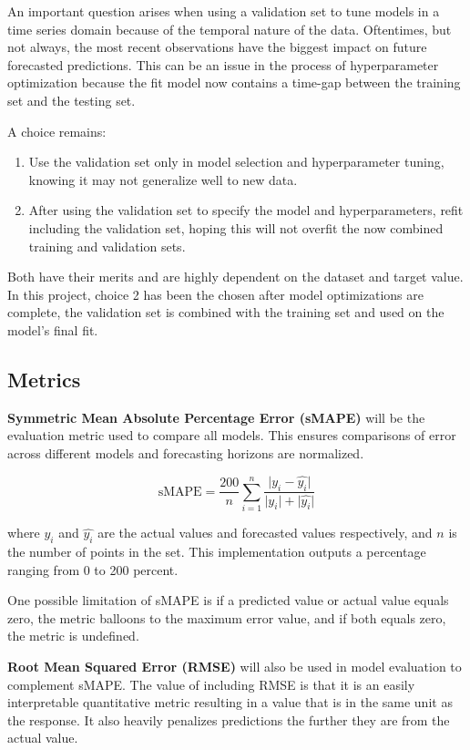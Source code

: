 \documentclass[sigconf]{acmart}
\begin{document}
An important question arises when using a validation set to tune models in a time series domain because of the temporal nature of the data. Oftentimes, but not always, the most recent observations have the biggest impact on future forecasted predictions. This can be an issue in the process of hyperparameter optimization because the fit model now contains a time-gap between the training set and the testing set.

A choice remains:

\begin{enumerate}
\item{Use the validation set only in model selection and hyperparameter tuning, knowing it may not generalize well to new data.}
\item{After using the validation set to specify the model and hyperparameters, refit including the validation set, hoping this will not overfit the now combined training and validation sets.}
\end{enumerate}
Both have their merits and are highly dependent on the dataset and target value. In this project, choice 2 has been the chosen after model optimizations are complete, the validation set is combined with the training set and used on the model's final fit.

\subsection{Metrics}
\textbf{Symmetric Mean Absolute Percentage Error (sMAPE)} will be the evaluation metric used to compare all models. This ensures comparisons of error across different models and forecasting horizons are normalized. 

\begin{equation}
\text{sMAPE} =\frac{200}{n}\sum_{i=1}^{n}\frac{\lvert y_i - \hat{y_i} \rvert}{\lvert y_i \rvert + \lvert \hat{y_i} \rvert}
\end{equation}

where $y_i$ and $\hat{y_i}$ are the actual values and forecasted values respectively, and $n$ is the number of points in the set. This implementation outputs a percentage ranging from 0 to 200 percent.

One possible limitation of sMAPE is if a predicted value or actual value equals zero, the metric balloons to the maximum error value, and if both equals zero, the metric is undefined.

\textbf{Root Mean Squared Error (RMSE)} will also be used in model evaluation to complement sMAPE. The value of including RMSE is that it is an easily interpretable quantitative metric resulting in a value that is in the same unit as the response. It also heavily penalizes predictions the further they are from the actual value.
\end{document}
